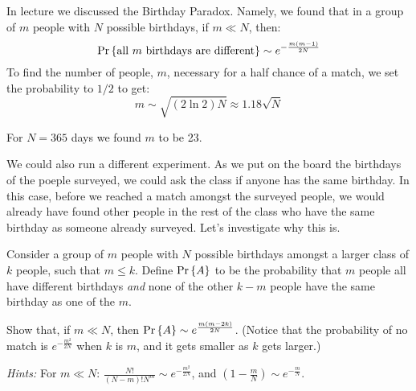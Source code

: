 \documentclass[12pt,twoside]{article}
\begin{document}


\begin{problem}{15}
In lecture we discussed the Birthday Paradox. Namely, we found that in a group of $m$ people with $N$ possible birthdays, if $m \ll N$, then:
\[
\mathop{\textup{Pr}}\nolimits\left\{\text{all $m$ birthdays are different}\right\} \sim e^{-\frac{m(m-1)}{2N}}
\]
To find the number of people, $m$, necessary for a half chance of a match, we set the probability to $1/2$ to get:
\[
m \sim \sqrt{(2\ln2)N} \approx 1.18\sqrt{N}
\]

For $N = 365$ days we found $m$ to be 23.

We could also run a different experiment. As we put on the board the birthdays of the poeple surveyed, we could ask the class if anyone has the same birthday. In this case, before we reached a match amongst the surveyed people, we would already have found other people in the rest of the class who have the same birthday as someone already surveyed. Let's investigate why this is.

\bparts
{} Consider a group of $m$ people with $N$ possible birthdays amongst a larger class of $k$ people, such that $m \leq k$. Define $\mathop{\textup{Pr}}\nolimits\left\{A\right\}$ to be the probability that $m$ people all have different birthdays \textit{and} none of the other $k-m$ people have the same birthday as one of the $m$.

Show that, if $m \ll N$, then $\mathop{\textup{Pr}}\nolimits\left\{A\right\} \sim e^{\frac{m(m-2k)}{2N}}$. (Notice that the probability of no match is $e^{-\frac{m^2}{2N}}$ when $k$ is $m$, and it gets smaller as $k$ gets larger.)

\hspace{0.5in} \textit{Hints:} For $m \ll N$: $\frac{N!}{(N-m)!N^m} \sim e^{-\frac{m^2}{2N}}$, and $(1-\frac{m}{N}) \sim e^{-\frac{m}{N}}$.



\end{problem}
\end{document}
